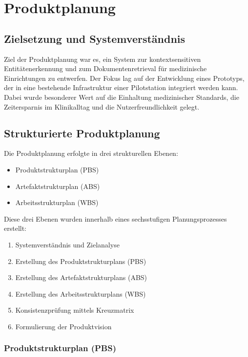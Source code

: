 \chapter{Produktplanung}
\label{sec:produktplanung}

\section{Zielsetzung und Systemverständnis}
Ziel der Produktplanung war es, ein System zur kontextsensitiven Entitätenerkennung und zum Dokumentenretrieval für medizinische Einrichtungen zu entwerfen. Der Fokus lag auf der Entwicklung eines Prototyps, der in eine bestehende Infrastruktur einer Pilotstation integriert werden kann. Dabei wurde besonderer Wert auf die Einhaltung medizinischer Standards, die Zeitersparnis im Klinikalltag und die Nutzerfreundlichkeit gelegt.

\section{Strukturierte Produktplanung}
Die Produktplanung erfolgte in drei strukturellen Ebenen:
\begin{itemize}
	\item Produktstrukturplan (PBS)
	\item Artefaktstrukturplan (ABS)
	\item Arbeitsstrukturplan (WBS)
\end{itemize}

Diese drei Ebenen wurden innerhalb eines sechsstufigen Planungsprozesses erstellt:
\vspace{-\topsep}
\begin{enumerate}
	\item Systemverständnis und Zielanalyse
	\item Erstellung des Produktstrukturplans (PBS)
	\item Erstellung des Artefaktstrukturplans (ABS)
	\item Erstellung des Arbeitsstrukturplans (WBS)
	\item Konsistenzprüfung mittels Kreuzmatrix
	\item Formulierung der Produktvision
\end{enumerate}

\subsection{Produktstrukturplan (PBS)}

